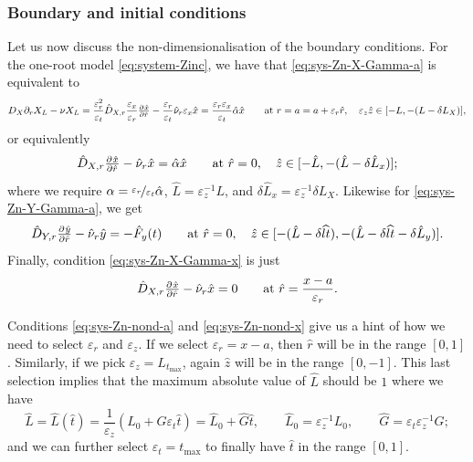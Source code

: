 \documentclass[11pt]{article}
\numberwithin{equation}{section}
\begin{document}
\subsubsection{Boundary and initial conditions}

Let us now discuss the non-dimensionalisation of the boundary conditions. For the one-root model \eqref{eq:system-Zinc}, we have that \eqref{eq:sys-Zn-X-Gamma-a} is equivalent to
\[
    D_X \partial_r X_L - \nu X_L = 
    \frac{\varepsilon_r^2}{\varepsilon_t} \hat{D}_{X,r} \frac{\varepsilon_x}{\varepsilon_r} \pd{\hat{x}}{\hat{r}} - \frac{\varepsilon_r}{\varepsilon_t} \hat{\nu}_r \varepsilon_x \hat{x} = \frac{\varepsilon_r \varepsilon_x}{\varepsilon_t} \hat{\alpha} \hat{x}
    \qquad \text{at } r = a = a + \varepsilon_r \hat{r},\quad \varepsilon_z \hat{z} \in [-L, -(L - \delta L_X)],
\]
or equivalently
\begin{equation}
    \label{eq:sys-Zn-nond-a}
    \hat{D}_{X,r} \pd{\hat{x}}{\hat{r}} - \hat{\nu}_r \hat{x} = \hat{\alpha} \hat{x}
    \qquad \text{at } \hat{r} = 0, \quad \hat{z} \in [-\hat{L}, -(\hat{L} - \delta \hat{L}_x)];
\end{equation}
where we require \( \alpha = \nicefrac{\varepsilon_r}{\varepsilon_t} \hat{\alpha}\), \( \hat{L} = \varepsilon_z^{-1} L\), and \( \delta\hat{L}_x = \varepsilon_z^{-1} \delta L_X\). Likewise for \eqref{eq:sys-Zn-Y-Gamma-a}, we get %
\begin{equation}
    \label{eq:sys-Zn-nond-b}
    \hat{D}_{Y,r} \pd{\hat{y}}{\hat{r}}  - \hat{\nu}_r \hat{y} = -\hat{F}_y(t)     \qquad\text{at } \hat{r} = 0, \quad \hat{z} \in [-(\hat{L} - \delta \widehat{lt}), -(\hat{L} - \delta \widehat{lt} - \delta \hat{L}_y)].
\end{equation}
Finally, condition \eqref{eq:sys-Zn-X-Gamma-x} is just
\begin{equation}
    \label{eq:sys-Zn-nond-x}
    \hat{D}_{X,r} \pd{\hat{x}}{\hat{r}} - \hat{\nu}_r \hat{x} = 0
    \qquad \text{at } \hat{r} = \frac{x-a}{\varepsilon_r}.
\end{equation}

Conditions \eqref{eq:sys-Zn-nond-a} and \eqref{eq:sys-Zn-nond-x} give us a hint of how we need to select \(\varepsilon_r\) and \(\varepsilon_z\). If we select \( \varepsilon_r = x-a\), then \( \hat{r} \) will be in the range \( [0,1]\). Similarly, if we pick \( \varepsilon_z = L_{t_{\max}}\), again \(\hat z \) will be in the range \([0,-1]\). This last selection implies that the maximum absolute value of \( \hat{L}\) should be \(1\) where we have
\[
    \hat{L} = \hat{L}(\hat t) = \frac{1}{\varepsilon_z} ( L_0 + G \varepsilon_t \hat t )
    = \hat{L}_0 + \hat{G} \hat t,
    \qquad 
    \hat{L}_0 = \varepsilon^{-1}_z L_0,
    \qquad
    \hat{G} = \varepsilon_t \varepsilon_z^{-1} G;
\]
and we can further select \( \varepsilon_t = t_{\max}\) to finally have \( \hat t\) in the range \( [0,1]\). 
\end{document}

